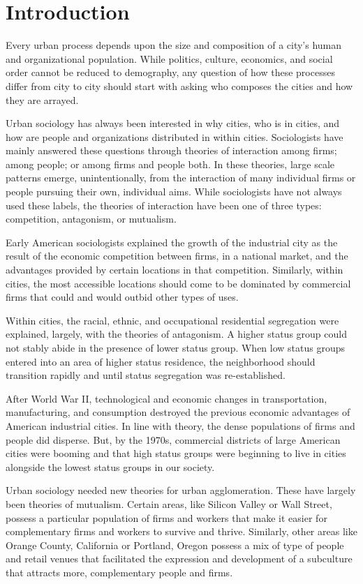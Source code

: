 \section*{Introduction}
Every urban process depends upon the size and composition of a city's
human and organizational population. While politics, culture,
economics, and social order cannot be reduced to demography, any
question of how these processes differ from city to city should start
with asking who composes the cities and how they are arrayed.

Urban sociology has always been interested in why cities, who is in
cities, and how are people and organizations distributed in within
cities. Sociologists have mainly answered these questions through
theories of interaction among firms; among people; or among firms and
people both. In these theories, large scale patterns emerge,
unintentionally, from the interaction of many individual firms or
people pursuing their own, individual aims.  While sociologists have
not always used these labels, the theories of interaction have been
one of three types: competition, antagonism, or mutualism.

Early American sociologists explained the growth of the industrial
city as the result of the economic competition between firms, in a
national market, and the advantages provided by certain locations in
that competition. Similarly, within cities, the most accessible
locations should come to be dominated by commercial firms that could
and would outbid other types of uses.

Within cities, the racial, ethnic, and occupational residential
segregation were explained, largely, with the theories of
antagonism. A higher status group could not stably abide in the
presence of lower status group. When low status groups entered into an
area of higher status residence, the neighborhood should transition
rapidly and until status segregation was re-established.

After World War II, technological and economic changes in
transportation, manufacturing, and consumption destroyed the previous
economic advantages of American industrial cities. In line with
theory, the dense populations of firms and people did disperse. But,
by the 1970s, commercial districts of large American cities were
booming and that high status groups were beginning to live in cities
alongside the lowest status groups in our society.

Urban sociology needed new theories for urban agglomeration. These
have largely been theories of mutualism. Certain areas, like Silicon
Valley or Wall Street, possess a particular population of firms and
workers that make it easier for complementary firms and workers to
survive and thrive. Similarly, other areas like Orange County,
California or Portland, Oregon possess a mix of type of people and
retail venues that facilitated the expression and development of a
subculture that attracts more, complementary people and firms.

